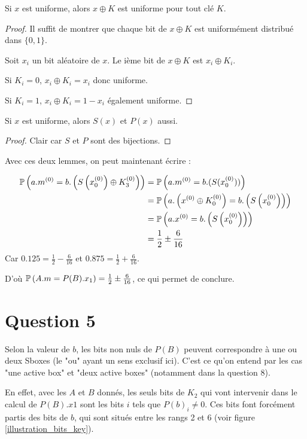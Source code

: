 \begin{lemma}
	Si $x$ est uniforme, alors $x \oplus K$ est uniforme pour tout clé $K$.
\end{lemma}

\begin{proof}
	Il suffit de montrer que chaque bit de $x \oplus K$ est uniformément distribué dans $\{0,1\}$.

	Soit $x_i$ un bit aléatoire de $x$. Le ième bit de $x \oplus K$ est $x_i \oplus K_i$.

	Si $K_i = 0$, $x_i \oplus K_i = x_i$ donc uniforme.

	Si $K_i = 1$, $x_i \oplus K_i = 1 - x_i$ également uniforme. 
\end{proof}

\begin{lemma}
	Si $x$ est uniforme, alors $S(x)$ et $P(x)$ aussi.
\end{lemma}
\begin{proof}
	Clair car $S$ et $P$ sont des bijections.
\end{proof}

Avec ces deux lemmes, on peut maintenant écrire :

\begin{align*}
\mathbb{P}\left( a.m^{(0)}= b.\left (S\left (x_0^{(0)}\right ) \oplus K_3^{(0)}\right ) \right) &= \mathbb{P}\left( a.m^{(0)} = b.(S(x_0^{(0)})) \right) \\
													&= \mathbb{P}\left( a.\left(x^{(0)} \oplus K_0^{(0)}\right ) =  b.\left (S\left (x_0^{(0)}\right )\right ) \right) \\
													&= \mathbb{P}\left( a.x^{(0)} = b.\left(S\left(x_0^{\left(0\right)}\right)\right) \right) \\
													&= \frac{1}{2} \pm \frac{6}{16}
\end{align*}
Car $0.125 = \frac{1}{2} - \frac{6}{16}$ et $0.875 = \frac{1}{2} + \frac{6}{16}$.

D'où $\mathbb{P}\left( A.m = P(B).x_1 \right) = \frac{1}{2} \pm \frac{6}{16}$, ce qui permet de conclure.

\section*{Question 5}

Selon la valeur de $b$, les bits non nuls de $P(B)$ peuvent correspondre à une ou deux Sboxes (le "ou" ayant un sens exclusif ici). C'est ce qu'on entend par les cas "une active box" et "deux active boxes" (notamment dans la question 8).

En effet, avec les $A$ et $B$ donnés, les seuls bits de $K_2$ qui vont intervenir dans le calcul de $P(B).x1$ sont les bits $i$ tels que $P(b)_i \neq 0$. Ces bits font forcément partis des bits de $b$, qui sont situés entre les rangs 2 et 6 (voir figure 
\ref{illustration_bits_key}).

